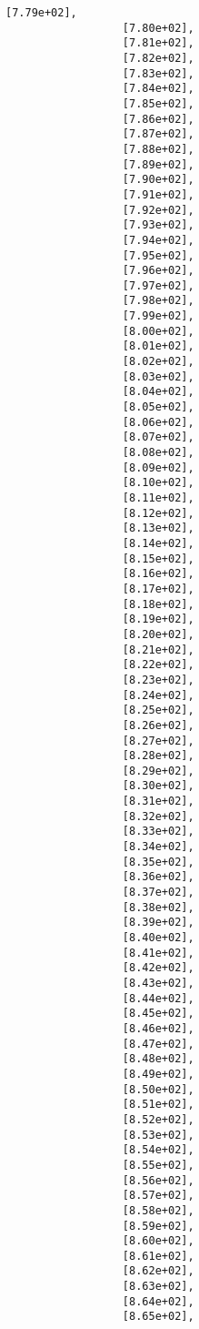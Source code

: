\documentclass[11pt]{article}
\begin{document}
\begin{Verbatim}[commandchars=\\\{\}]
                  [7.79e+02],
                  [7.80e+02],
                  [7.81e+02],
                  [7.82e+02],
                  [7.83e+02],
                  [7.84e+02],
                  [7.85e+02],
                  [7.86e+02],
                  [7.87e+02],
                  [7.88e+02],
                  [7.89e+02],
                  [7.90e+02],
                  [7.91e+02],
                  [7.92e+02],
                  [7.93e+02],
                  [7.94e+02],
                  [7.95e+02],
                  [7.96e+02],
                  [7.97e+02],
                  [7.98e+02],
                  [7.99e+02],
                  [8.00e+02],
                  [8.01e+02],
                  [8.02e+02],
                  [8.03e+02],
                  [8.04e+02],
                  [8.05e+02],
                  [8.06e+02],
                  [8.07e+02],
                  [8.08e+02],
                  [8.09e+02],
                  [8.10e+02],
                  [8.11e+02],
                  [8.12e+02],
                  [8.13e+02],
                  [8.14e+02],
                  [8.15e+02],
                  [8.16e+02],
                  [8.17e+02],
                  [8.18e+02],
                  [8.19e+02],
                  [8.20e+02],
                  [8.21e+02],
                  [8.22e+02],
                  [8.23e+02],
                  [8.24e+02],
                  [8.25e+02],
                  [8.26e+02],
                  [8.27e+02],
                  [8.28e+02],
                  [8.29e+02],
                  [8.30e+02],
                  [8.31e+02],
                  [8.32e+02],
                  [8.33e+02],
                  [8.34e+02],
                  [8.35e+02],
                  [8.36e+02],
                  [8.37e+02],
                  [8.38e+02],
                  [8.39e+02],
                  [8.40e+02],
                  [8.41e+02],
                  [8.42e+02],
                  [8.43e+02],
                  [8.44e+02],
                  [8.45e+02],
                  [8.46e+02],
                  [8.47e+02],
                  [8.48e+02],
                  [8.49e+02],
                  [8.50e+02],
                  [8.51e+02],
                  [8.52e+02],
                  [8.53e+02],
                  [8.54e+02],
                  [8.55e+02],
                  [8.56e+02],
                  [8.57e+02],
                  [8.58e+02],
                  [8.59e+02],
                  [8.60e+02],
                  [8.61e+02],
                  [8.62e+02],
                  [8.63e+02],
                  [8.64e+02],
                  [8.65e+02],

\end{Verbatim}
\end{document}
